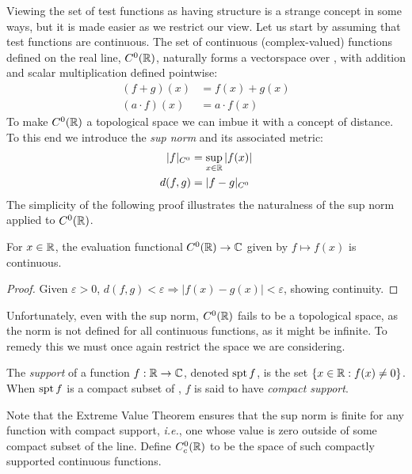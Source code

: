     Viewing the set of test functions as having structure is a strange concept in some ways, but it is made easier as we restrict our view.
    Let us start by assuming that test functions are continuous.
    The set of continuous (complex-valued) functions defined on the real line, $C^0(\mathbb{R})$, naturally forms a vectorspace over \R, with addition and scalar multiplication defined pointwise: 
    \begin{align*}
      (f+g)(x) &= f(x)+g(x)\\
      (a\cdot f)(x) &= a\cdot f(x)
    \end{align*}
    To make $C^0(\mathbb{R})$ a topological space we can imbue it with a concept of distance.
    To this end we introduce the \emph{sup norm} and its associated metric:
    \begin{align*}
      |f|_{C^0} &= \sup_{x\in\mathbb{R}}|f(x)|\\
      d(f,g) &= |f-g|_{C^0}
    \end{align*}
    The simplicity of the following proof illustrates the naturalness of the sup norm applied to $C^0(\mathbb{R})$.

    \begin{claim}
      For $x\in\mathbb{R}$, the evaluation functional $C^0(\mathbb{R})\rightarrow\mathbb{C}$ given by $f\mapsto f(x)$ is continuous.
      \begin{proof}
        Given $\varepsilon > 0$, $d(f,g)<\varepsilon \Rightarrow |f(x)-g(x)|<\varepsilon$, showing continuity.
      \end{proof}
    \end{claim}

    Unfortunately, even with the sup norm, $C^0(\mathbb{R})$ fails to be a topological space, as the norm is not defined for all continuous functions, as it might be infinite. 
    To remedy this we must once again restrict the space we are considering.
    \begin{defn}
      The \emph{support} of a function $f:\mathbb{R}\rightarrow\mathbb{C}$, denoted $\operatorname{spt} f$, is the set $\{x\in\mathbb{R}: f(x)\ne0\}$.
      When $\operatorname{spt} f$ is a compact subset of \R, $f$ is said to have \emph{compact support}.
    \end{defn}
    
    Note that the Extreme Value Theorem ensures that the sup norm is finite for any function with compact support, \emph{i.e.}, one whose value is zero outside of some compact subset of the line.
    Define $C^0_c(\mathbb{R})$ to be the space of such compactly supported continuous functions.

